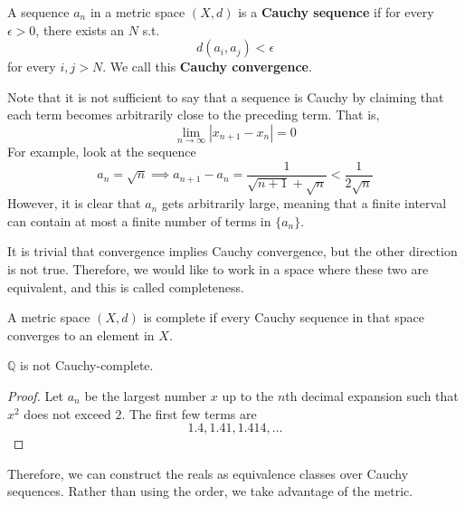     \begin{definition}
      A sequence $a_n$ in a metric space $(X, d)$ is a \textbf{Cauchy sequence} if for every $\epsilon > 0$, there exists an $N$ s.t. 
      \begin{equation}
        d(a_i, a_j) < \epsilon
      \end{equation}
      for every $i, j > N$. We call this \textbf{Cauchy convergence}. 
    \end{definition}

    Note that it is not sufficient to say that a sequence is Cauchy by claiming that each term becomes arbitrarily close to the preceding term. That is, 
    \begin{equation}
      \lim_{n \rightarrow \infty} |x_{n+1} - x_{n}| = 0
    \end{equation}
    For example, look at the sequence 
    \begin{equation}
      a_n = \sqrt{n} \implies a_{n+1} - a_{n} = \frac{1}{\sqrt{n+1} + \sqrt{n}} < \frac{1}{2\sqrt{n}}
    \end{equation}
    However, it is clear that $a_n$ gets arbitrarily large, meaning that a finite interval can contain at most a finite number of terms in $\{a_n\}$. 

    It is trivial that convergence implies Cauchy convergence, but the other direction is not true. Therefore, we would like to work in a space where these two are equivalent, and this is called completeness. 

    \begin{definition}
      A metric space $(X, d)$ is complete if every Cauchy sequence in that space converges to an element in $X$. 
    \end{definition} 

    \begin{theorem}
      $\mathbb{Q}$ is not Cauchy-complete. 
    \end{theorem}
    \begin{proof}
      Let $a_n$ be the largest number $x$ up to the $n$th decimal expansion such that $x^2$ does not exceed $2$. The first few terms are 
      \begin{equation}
        1.4, 1.41, 1.414, \ldots
      \end{equation}
    \end{proof}

    Therefore, we can construct the reals as equivalence classes over Cauchy sequences. Rather than using the order, we take advantage of the metric. 

